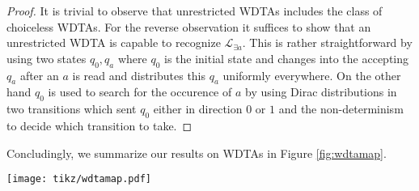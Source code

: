\begin{proof}
  It is trivial to observe that unrestricted \acp{WDTA} includes the class of 
  choiceless \acp{WDTA}. For the reverse observation it suffices to show that
  an unrestricted \ac{WDTA} is capable to recognize $\mathcal{L}_{\exists a}$.
  This is rather straightforward by using two states $q_{0}, q_{a}$ where 
  $q_{0}$ is the initial state and changes into the accepting $q_{a}$ after an
  $a$ is read and distributes this $q_{a}$ uniformly everywhere. On the other
  hand $q_{0}$ is used to search for the occurence of $a$ by using Dirac 
  distributions in two transitions which sent $q_{0}$ either in direction $0$
  or $1$ and the non-determinism to decide which transition to take.
\end{proof}

Concludingly, we summarize our results on \acp{WDTA} in Figure 
\ref{fig:wdtamap}.
\begin{drawing}
  \caption{
    A \enquote{map} of the presented results for \acp{WDTA}. Arrows marked with 
    inclusion symbols are used to illustrate increasing expressiveness from 
    the beginning to the end of the arrow (the equality symbol is striked out
    if it is a proven strict generalisation). Annotated $\cap$, $\cup$ and 
    $\neg$ stand for closure under intersection, union and complement 
    respectively. Naturally, a striked out version of one operater shows the 
    proven lack of closure under it. Additionally, we use $B\nsubseteq P$ to 
    state that a model restricted to a Büchi-condition is not included in a 
    model with access to Parity-conditions. Colors encode decidability results 
    for the emptiness problem: red illustrates undecidability, green 
    decidability and purple decidability for Büchi- but undecidability for 
    Parity-conditions.
  }
  \label{fig:wdtamap}
  \begin{center}
    \texttt{[image: tikz/wdtamap.pdf]}
  \end{center}
\end{drawing}
